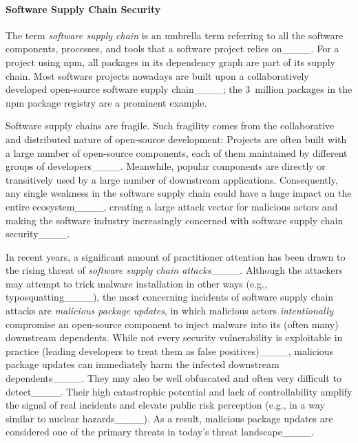 \paragraph{Software Supply Chain Security}

The term \textit{software supply chain} is an umbrella term referring to all the software components, processes, and tools that a software project relies on____.
For a project using npm, all packages in its dependency graph are part of its supply chain.
Most software projects nowadays are built upon a collaboratively developed open-source software supply chain____; the 3~million packages in the npm package registry are a prominent example.

Software supply chains are fragile.
Such fragility comes from the collaborative and distributed nature of open-source development: Projects are often built with a large number of open-source components, each of them maintained by different groups of developers____.
Meanwhile, popular components are directly or transitively used by a large number of downstream applications.
Consequently, any single weakness in the software supply chain could have a huge impact on the entire ecosystem____, creating a large attack vector for malicious actors and making the software industry increasingly concerned with software supply chain security____.

In recent years, a significant amount of practitioner attention has been drawn to the rising threat of \emph{software supply chain attacks}____. 
Although the attackers may attempt to trick malware installation in other ways (e.g., typosquatting____), the most concerning incidents of software supply chain attacks are \emph{malicious package updates}, in which malicious actors \textit{intentionally} compromise an open-source component to inject malware into its (often many) downstream dependents.
While not every security vulnerability is exploitable in practice (leading developers to treat them as false positives)____, malicious package updates can immediately harm the infected downstream dependents____. 
They may also be well obfuscated and often very difficult to detect____.
Their high catastrophic potential and lack of controllability amplify the signal of real incidents and elevate public risk perception (e.g., in a way similar to nuclear hazards____).
As a result, malicious package updates are considered one of the primary threats in today's threat landscape____.
 

